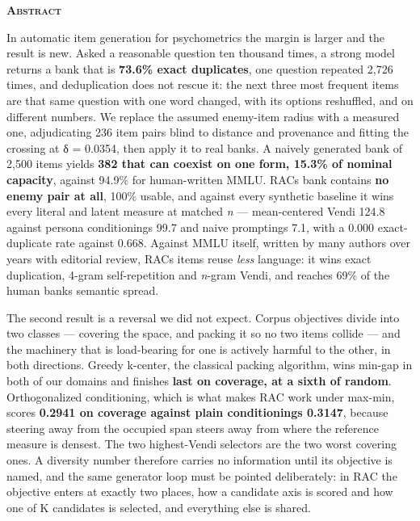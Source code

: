 \documentclass[
  10pt,
]{article}
\theoremstyle{plain}
\theoremstyle{definition}
\newenvironment{iclrabstract}
  {\vspace{0.4em}\begin{center}{\bfseries\scshape Abstract}\end{center}
   \begin{list}{}{\setlength{\leftmargin}{0.45in}\setlength{\rightmargin}{0.45in}}\item[]\relax}
  {\end{list}\vspace{0.6em}}
\begin{document}
\begin{iclrabstract}
In automatic item generation for psychometrics the margin is larger and
the result is new. Asked a reasonable question ten thousand times, a
strong model returns a bank that is \textbf{73.6\% exact duplicates},
one question repeated 2,726 times, and deduplication does not rescue it:
the next three most frequent items are that same question with one word
changed, with its options reshuffled, and on different numbers. We
replace the assumed enemy-item radius with a measured one, adjudicating
236 item pairs blind to distance and provenance and fitting the crossing
at δ = 0.0354, then apply it to real banks. A naively generated bank of
2,500 items yields \textbf{382 that can coexist on one form, 15.3\% of
nominal capacity}, against 94.9\% for human-written MMLU.
RAC\textquotesingle s bank contains \textbf{no enemy pair at all}, 100\%
usable, and against every synthetic baseline it wins every literal and
latent measure at matched \emph{n} --- mean-centered Vendi 124.8 against
persona conditioning\textquotesingle s 99.7 and naive
prompting\textquotesingle s 7.1, with a 0.000 exact-duplicate rate
against 0.668. Against MMLU itself, written by many authors over years
with editorial review, RAC\textquotesingle s items reuse \emph{less}
language: it wins exact duplication, 4-gram self-repetition and
\emph{n}-gram Vendi, and reaches 69\% of the human
bank\textquotesingle s semantic spread.

The second result is a reversal we did not expect. Corpus objectives
divide into two classes --- covering the space, and packing it so no two
items collide --- and the machinery that is load-bearing for one is
actively harmful to the other, in both directions. Greedy k-center, the
classical packing algorithm, wins min-gap in both of our domains and
finishes \textbf{last on coverage, at a sixth of random}. Orthogonalized
conditioning, which is what makes RAC work under max-min, scores
\textbf{0.2941 on coverage against plain conditioning\textquotesingle s
0.3147}, because steering away from the occupied span steers away from
where the reference measure is densest. The two highest-Vendi selectors
are the two worst covering ones. A diversity number therefore carries no
information until its objective is named, and the same generator loop
must be pointed deliberately: in RAC the objective enters at exactly two
places, how a candidate axis is scored and how one of K candidates is
selected, and everything else is shared.


\end{iclrabstract}
\end{document}
